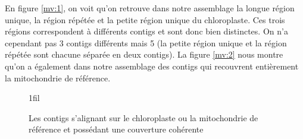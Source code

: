 \documentclass[a4paper]{article}
\makeatletter
\newcommand*{\centerfloat}{%
  \parindent \z@
  \leftskip \z@ \@plus 1fil \@minus \textwidth
  \rightskip\leftskip
  \parfillskip \z@skip}
\makeatother
\begin{document}
En figure \ref{mv:1}, on voit qu'on retrouve dans notre assemblage la longue région unique, la région répétée et la petite région unique du chloroplaste. Ces trois régions correspondent à différents contigs et sont donc bien distinctes. On n'a cependant pas 3 contigs différents mais 5 (la petite région unique et la région répétée sont chacune séparée en deux contigs). 
La figure \ref{mv:2} nous montre qu'on a également dans notre assemblage des contigs qui recouvrent entièrement la mitochondrie de référence. 

\begin{figure}[!ht]
\centerfloat

 \hspace{5mm}

\label{contig}
\caption{Les contigs s'alignant sur le chloroplaste ou la mitochondrie de référence et possédant une couverture cohérente}
\end{figure}
\end{document}
